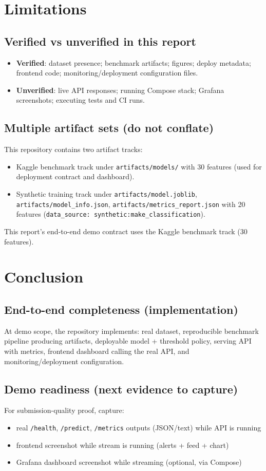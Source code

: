 \documentclass[11pt]{article}
\newcommand{\code}[1]{\texttt{#1}}
\newcommand{\statusverified}{\textbf{Verified}}
\newcommand{\statusunverified}{\textbf{Unverified}}
\begin{document}
\section{Limitations}
\subsection{Verified vs unverified in this report}
\begin{itemize}
  \item \statusverified{}: dataset presence; benchmark artifacts; figures; deploy metadata; frontend code; monitoring/deployment configuration files.
  \item \statusunverified{}: live API responses; running Compose stack; Grafana screenshots; executing tests and CI runs.
\end{itemize}

\subsection{Multiple artifact sets (do not conflate)}
This repository contains two artifact tracks:
\begin{itemize}
  \item Kaggle benchmark track under \code{artifacts/models/} with 30 features (used for deployment contract and dashboard).
  \item Synthetic training track under \code{artifacts/model.joblib}, \code{artifacts/model_info.json}, \code{artifacts/metrics_report.json} with 20 features (\code{data_source: synthetic:make_classification}).
\end{itemize}
This report's end-to-end demo contract uses the Kaggle benchmark track (30 features).

\section{Conclusion}
\subsection{End-to-end completeness (implementation)}
At demo scope, the repository implements: real dataset, reproducible benchmark pipeline producing artifacts, deployable model + threshold policy, serving API with metrics, frontend dashboard calling the real API, and monitoring/deployment configuration.

\subsection{Demo readiness (next evidence to capture)}
For submission-quality proof, capture:
\begin{itemize}
  \item real \code{/health}, \code{/predict}, \code{/metrics} outputs (JSON/text) while API is running
  \item frontend screenshot while stream is running (alerts + feed + chart)
  \item Grafana dashboard screenshot while streaming (optional, via Compose)
\end{itemize}
\end{document}
